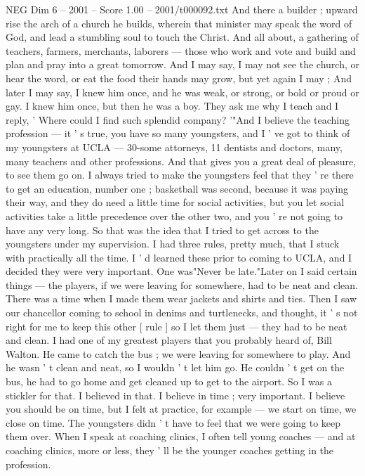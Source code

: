 \begin{textsample}{NEG Dim 6 – 2001 – Score 1.00 – 2001/t000092.txt}
And there a builder ; upward rise the arch of a church he builds, wherein that minister may speak the word of God, and lead a stumbling soul to touch the Christ.
And all about, a gathering of teachers, farmers, merchants, laborers — those who work and vote and build and plan and pray into a great tomorrow.
And I may say, I may not see the church, or hear the word, or eat the food their hands may grow, but yet again I may ; And later I may say, I knew him once, and he was weak, or strong, or bold or proud or gay.
I knew him once, but then he was a boy.
They ask me why I teach and I reply, ' Where could I find such splendid company? '"And I believe the teaching profession — it ' s true, you have so many youngsters, and I ' ve got to think of my youngsters at UCLA — 30-some attorneys, 11 dentists and doctors, many, many teachers and other professions.
And that gives you a great deal of pleasure, to see them go on.
I always tried to make the youngsters feel that they ' re there to get an education, number one ; basketball was second, because it was paying their way, and they do need a little time for social activities, but you let social activities take a little precedence over the other two, and you ' re not going to have any very long.
So that was the idea that I tried to get across to the youngsters under my supervision.
I had three rules, pretty much, that I stuck with practically all the time.
I ' d learned these prior to coming to UCLA, and I decided they were very important.
One was"Never be late."Later on I said certain things — the players, if we were leaving for somewhere, had to be neat and clean.
There was a time when I made them wear jackets and shirts and ties.
Then I saw our chancellor coming to school in denims and turtlenecks, and thought, it ' s not right for me to keep this other [ rule ] so I let them just — they had to be neat and clean.
I had one of my greatest players that you probably heard of, Bill Walton.
He came to catch the bus ; we were leaving for somewhere to play.
And he wasn ' t clean and neat, so I wouldn ' t let him go.
He couldn ' t get on the bus, he had to go home and get cleaned up to get to the airport.
So I was a stickler for that.
I believed in that.
I believe in time ; very important.
I believe you should be on time, but I felt at practice, for example — we start on time, we close on time.
The youngsters didn ' t have to feel that we were going to keep them over.
When I speak at coaching clinics, I often tell young coaches — and at coaching clinics, more or less, they ' ll be the younger coaches getting in the profession.

\end{textsample}
